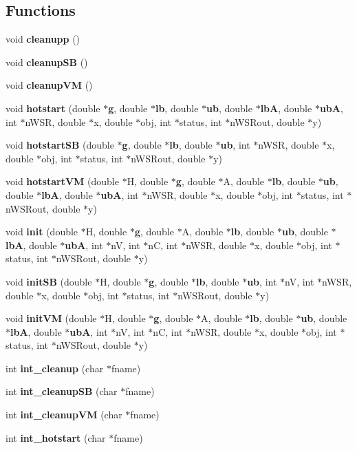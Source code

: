 \subsection*{Functions}
\begin{DoxyCompactItemize}
\item 
void {\bf cleanupp} ()
\item 
void {\bf cleanupSB} ()
\item 
void {\bf cleanupVM} ()
\item 
void {\bf hotstart} (double $\ast${\bf g}, double $\ast${\bf lb}, double $\ast${\bf ub}, double $\ast${\bf lbA}, double $\ast${\bf ubA}, int $\ast$nWSR, double $\ast$x, double $\ast$obj, int $\ast$status, int $\ast$nWSRout, double $\ast$y)
\item 
void {\bf hotstartSB} (double $\ast${\bf g}, double $\ast${\bf lb}, double $\ast${\bf ub}, int $\ast$nWSR, double $\ast$x, double $\ast$obj, int $\ast$status, int $\ast$nWSRout, double $\ast$y)
\item 
void {\bf hotstartVM} (double $\ast$H, double $\ast${\bf g}, double $\ast$A, double $\ast${\bf lb}, double $\ast${\bf ub}, double $\ast${\bf lbA}, double $\ast${\bf ubA}, int $\ast$nWSR, double $\ast$x, double $\ast$obj, int $\ast$status, int $\ast$nWSRout, double $\ast$y)
\item 
void {\bf init} (double $\ast$H, double $\ast${\bf g}, double $\ast$A, double $\ast${\bf lb}, double $\ast${\bf ub}, double $\ast${\bf lbA}, double $\ast${\bf ubA}, int $\ast$nV, int $\ast$nC, int $\ast$nWSR, double $\ast$x, double $\ast$obj, int $\ast$status, int $\ast$nWSRout, double $\ast$y)
\item 
void {\bf initSB} (double $\ast$H, double $\ast${\bf g}, double $\ast${\bf lb}, double $\ast${\bf ub}, int $\ast$nV, int $\ast$nWSR, double $\ast$x, double $\ast$obj, int $\ast$status, int $\ast$nWSRout, double $\ast$y)
\item 
void {\bf initVM} (double $\ast$H, double $\ast${\bf g}, double $\ast$A, double $\ast${\bf lb}, double $\ast${\bf ub}, double $\ast${\bf lbA}, double $\ast${\bf ubA}, int $\ast$nV, int $\ast$nC, int $\ast$nWSR, double $\ast$x, double $\ast$obj, int $\ast$status, int $\ast$nWSRout, double $\ast$y)
\item 
int {\bf int\_\-cleanup} (char $\ast$fname)
\item 
int {\bf int\_\-cleanupSB} (char $\ast$fname)
\item 
int {\bf int\_\-cleanupVM} (char $\ast$fname)
\item 
int {\bf int\_\-hotstart} (char $\ast$fname)

\end{DoxyCompactItemize}
